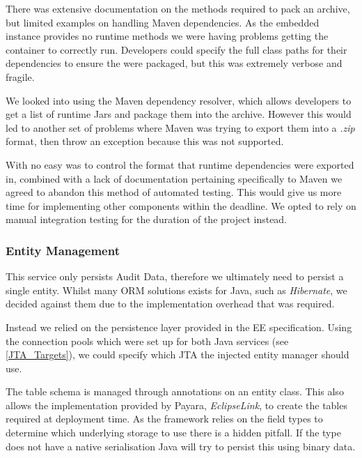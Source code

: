         \par
        There was extensive documentation on the methods required to pack an archive, but limited examples on handling Maven dependencies. As the embedded instance provides no runtime methods we were having problems getting the container to correctly run. Developers could specify the full class paths for their dependencies to ensure the were packaged, but this was extremely verbose and fragile.

        \par
        We looked into using the Maven dependency resolver, which allows developers to get a list of runtime Jars and package them into the archive. However this would led to another set of problems where Maven was trying to export them into a \textit{.zip} format, then throw an exception because this was not supported.

        \par
        With no easy was to control the format that runtime dependencies were exported in, combined with a lack of documentation pertaining specifically to Maven we agreed to abandon this method of automated testing. This would give us more time for implementing other components within the deadline. We opted to rely on manual integration testing for the duration of the project instead.

        \subsubsection{Entity Management}
        This service only persists Audit Data, therefore we ultimately need to persist a single entity. Whilst many ORM solutions exists for Java, such as \textit{Hibernate}, we decided against them due to the implementation overhead that was required.

        \par
        Instead we relied on the persistence layer provided in the EE specification. Using the connection pools which were set up for both Java services (see \ref{JTA_Targets}), we could specify which JTA the injected entity manager should use.

        \par
        The table schema is managed through annotations on an entity class. This also allows the implementation provided by Payara, \textit{EclipseLink}, to create the tables required at deployment time. As the framework relies on the field types to determine which underlying storage to use there is a hidden pitfall. If the type does not have a native serialisation Java will try to persist this using binary data.

